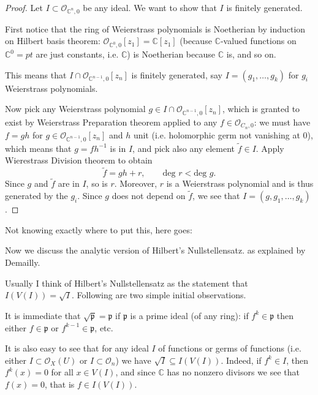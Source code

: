 \begin{proof}
Let $I \subset \mathcal{O}_{\mathbb{C}^n,0}$
be any ideal.
We want to show that $I$ is finitely
generated.

First notice that the ring of Weierstrass
polynomials is
Noetherian by induction on Hilbert basis
theorem:
$\mathcal{O}_{\mathbb{C}^0,0}[z_1]=\mathbb{C}
[z_1]$
(because $\mathbb{C}$-valued functions on
$\mathbb{C}^0=pt$
are just constants, i.e. $\mathbb{C}$)
is Noetherian because $\mathbb{C}$ is,
and so on.

This means that $I \cap
\mathcal{O}_{\mathbb{C}^{n-1},0}[z_n]$
is finitely generated, say $I=(g_1,…,g_k)$
for $g_i$ Weierstrass polynomials.

Now pick any Weierstrass polynomial
$g \in I \cap
\mathcal{O}_{\mathbb{C}^{n-1},0}[z_n]$,
which is granted to exist by Weierstrass
Preparation theorem
applied to any $f \in \mathcal{O}_{C_n,0}$:
we must have $f=gh$ for $g \in
\mathcal{O}_{\mathbb{C}^{n-1},0}[z_n]$
and $h$ unit (i.e. holomorphic germ not
vanishing at $0$),
which means that $g=fh^{-1}$ is in $I$,
and pick also any element $\tilde{f} \in I$.
Apply Wierestrass Division theorem to obtain
$$
\tilde{f}=gh+r,\qquad \text{deg }r <
\text{deg }g.
$$
Since $g$ and $\tilde{f}$ are in $I$, so is
$r$.
Moreover, $r$ is a Weierstrass polynomial and
is thus generated
by the $g_i$. Since $g$ does not depend on
$\tilde{f}$,
we see that $I=(g,g_1,…,g_k)$.
\end{proof}

\medskip\noindent
Not knowing exactly where to put this, here
goes:

\medskip\noindent
Now we discuss the analytic version of
Hilbert's Nullstellensatz.
as explained by Demailly.

\noindent
Usually I think of Hilbert's Nullstellensatz
as the statement that $I(V(I))=\sqrt{I}$.
Following are two simple initial
observations.

It is immediate that
$\sqrt{\mathfrak{p}}=\mathfrak{p}$
if $\mathfrak{p}$ is a prime ideal (of any
ring):
if  $f^k \in \mathfrak{p}$ then
either $f \in \mathfrak{p}$ or $f^{k-1}\in
\mathfrak{p}$,
etc.

It is also easy to see that
for any ideal $I$ of functions or germs of
functions
(i.e. either  $I \subset \mathcal{O}_X(U)$
or $I \subset \mathcal{O}_n$)
we have
$\sqrt{I}\subseteq I(V(I))$.
Indeed, if $f^k \in I$,
then $f^k(x)=0$ for all $x \in V(I)$,
and since $\mathbb{C}$ has no nonzero
divisors
we see that $f(x)=0$,
that is $f \in I(V(I))$.

